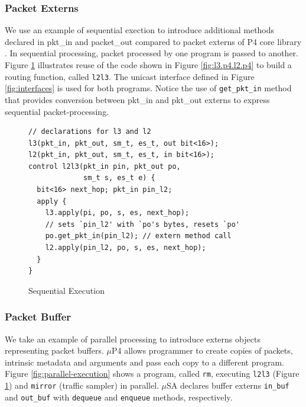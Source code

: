 \documentclass{hotnets19}
\begin{document}
\subsubsection{Packet Externs}
We use an example of sequential exection to introduce additional methods declared in pkt\_in and packet\_out compared to packet externs of P4 core library \cite{core.p4}.
In sequential processing, packet processed by one program is passed to another.
Figure \ref{fig:sequential-execution} illustrates reuse of the code shown in Figure \ref{fig:l3.p4.l2.p4} to build a routing function, called \texttt{l2l3}.
The unicast interface defined in Figure \ref{fig:interfaces} is used for both programs.
Notice the use of \texttt{get\_pkt\_in} method that provides conversion between pkt\_in and pkt\_out externs to express sequential packet-processing.
\begin{figure}
\begin{lstlisting}[frame=none]
// declarations for l3 and l2
l3(pkt_in, pkt_out, sm_t, es_t, out bit<16>);
l2(pkt_in, pkt_out, sm_t, es_t, in bit<16>);
control l2l3(pkt_in pin, pkt_out po, 
             sm_t s, es_t e) {
  bit<16> next_hop; pkt_in pin_l2;
  apply {
    l3.apply(pi, po, s, es, next_hop);
    // sets `pin_l2' with `po's bytes, resets `po'
    po.get_pkt_in(pin_l2); // extern method call
    l2.apply(pin_l2, po, s, es, next_hop);
  }
}
\end{lstlisting}
\caption{Sequential Execution}
\label{fig:sequential-execution}
\end{figure}

\subsubsection{Packet Buffer}
We take an example of parallel processing to introduce externs objects representing packet buffers.
$\mu$P4 allows programmer to create copies of packets, intrinsic metadata and arguments and pass each copy to a different program.
Figure \ref{fig:parallel-execution} shows a program, called \texttt{rm}, executing \texttt{l2l3} (Figure \ref{fig:sequential-execution}) and \texttt{mirror} (traffic sampler) in parallel.
$\mu$SA declares buffer externs \texttt{in\_buf} and \texttt{out\_buf} with \texttt{dequeue} and \texttt{enqueue} methods, respectively.
\end{document}
